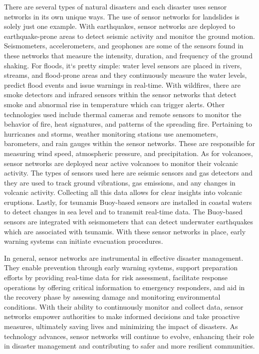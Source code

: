 \documentclass[conference]{IEEEtran}
\begin{document}
There are several types of natural disasters and each disaster uses sensor networks in its own unique ways. 
The use of sensor networks for landslides is solely just one example. With earthquakes, sensor networks are 
deployed to earthquake-prone areas to detect seismic activity and monitor the ground motion. Seismometers, 
accelerometers, and geophones are some of the sensors found in these networks that measure the intensity, 
duration, and frequency of the ground shaking. For floods, it`s pretty simple: water level sensors are placed 
in rivers, streams, and flood-prone areas and they continuously measure the water levels, predict flood events 
and issue warnings in real-time. With wildfires, there are smoke detectors and infrared sensors within the 
sensor networks that detect smoke and abnormal rise in temperature which can trigger alerts. Other technologies 
used include thermal cameras and remote sensors to monitor the behavior of fire, heat signatures, and patterns 
of the spreading fire. Pertaining to hurricanes and storms, weather monitoring stations use anemometers, 
barometers, and rain gauges within the sensor networks. These are responsible for measuring wind speed, 
atmospheric pressure, and precipitation. As for volcanoes, sensor networks are deployed near active volcanoes 
to monitor their volcanic activity. The types of sensors used here are seismic sensors and gas detectors 
and they are used to track ground vibrations, gas emissions, and any changes in volcanic activity. 
Collecting all this data allows for clear insights into volcanic eruptions. Lastly, for tsunamis Buoy-based 
sensors are installed in coastal waters to detect changes in sea level and to transmit real-time data. The 
Buoy-based sensors are integrated with seismometers that can detect underwater earthquakes which are 
associated with tsunamis. With these sensor networks in place, early warning systems can initiate evacuation 
procedures.\par

In general, sensor networks are instrumental in effective disaster management. They enable prevention through 
early warning systems, support preparation efforts by providing real-time data for risk assessment, facilitate 
response operations by offering critical information to emergency responders, and aid in the recovery phase by 
assessing damage and monitoring environmental conditions. With their ability to continuously monitor and 
collect data, sensor networks empower authorities to make informed decisions and take proactive measures, 
ultimately saving lives and minimizing the impact of disasters. As technology advances, sensor networks will 
continue to evolve, enhancing their role in disaster management and contributing to safer and more resilient 
communities.\par
\end{document}
